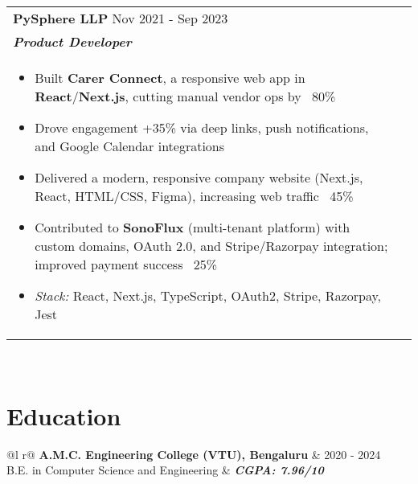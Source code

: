 \documentclass[a4paper,8pt]{article}
\begin{document}
\begin{tabularx}{\linewidth}{ @{}l r@{} }
\textbf{{PySphere LLP}} \hfill \color[HTML]{371e77} Nov 2021 - Sep 2023 \\[4pt]
\color[HTML]{371e77}\textbf{\textit{Product Developer}} \hfill \color[HTML]{4B28A4} \\[5pt]
\begin{minipage}[t]{\linewidth}
    \begin{itemize}[nosep,after=\strut, leftmargin=2em, itemsep=2pt]
        \item Built \textbf{Carer Connect}, a responsive web app in \textbf{React}/\textbf{Next.js}, cutting manual vendor ops by ~80\%
        \item Drove engagement +35\% via deep links, push notifications, and Google Calendar integrations
        \item Delivered a modern, responsive company website (Next.js, React, HTML/CSS, Figma), increasing web traffic ~45\%
        \item Contributed to \textbf{SonoFlux} (multi-tenant platform) with custom domains, OAuth 2.0, and Stripe/Razorpay integration; improved payment success ~25\%
        \item \textit{Stack:} React, Next.js, TypeScript, OAuth2, Stripe, Razorpay, Jest
    \end{itemize}
    \end{minipage}
\end{tabularx}\\[3pt]

\section{Education}
\begin{tabularx}{\linewidth}{ @{}l r@{} }
\textbf{A.M.C. Engineering College (VTU), Bengaluru} & \hfill \color[HTML]{371e77} 2020 - 2024 \\
\color[HTML]{371e77} B.E. in Computer Science and Engineering & \hfill \color[HTML]{4B28A4} \textit{\textbf{CGPA: 7.96/10}} \\
\end{tabularx}\\[3pt]

\end{document}
